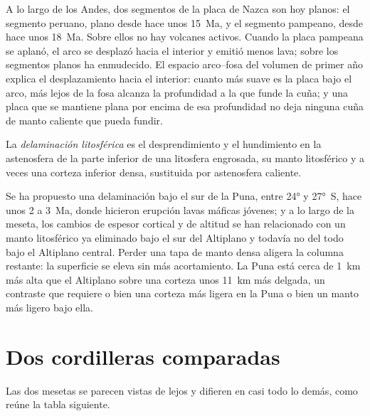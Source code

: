 A lo largo de los Andes, dos segmentos de la placa de Nazca son hoy planos: el segmento peruano, plano
desde hace unos \qty{15}{Ma}, y el segmento pampeano, desde hace unos \qty{18}{Ma}. Sobre ellos no
hay volcanes activos. Cuando la placa pampeana se aplanó, el arco se desplazó hacia el interior y emitió
menos lava; sobre los segmentos planos ha enmudecido. El espacio arco--fosa del volumen de primer año
explica el desplazamiento hacia el interior: cuanto más suave es la placa bajo el arco, más lejos de la fosa
alcanza la profundidad a la que funde la cuña; y una placa que se mantiene plana por encima de esa profundidad no deja
ninguna cuña de manto caliente que pueda fundir.

\begin{definition}\label{def:b2:himalaya-andes:delamination}
La \emph{delaminación litosférica} es el desprendimiento y el
hundimiento en la astenosfera de la parte inferior de una litosfera engrosada, su manto
litosférico y a veces una corteza inferior densa, sustituida por astenosfera caliente.
\end{definition}

Se ha propuesto una delaminación bajo el sur de la Puna, entre \ang{24} y \ang{27}~S,
hace unos 2 a \qty{3}{Ma}, donde hicieron erupción lavas máficas jóvenes; y a lo largo de la meseta, los cambios
de espesor cortical y de altitud se han relacionado con un manto litosférico ya eliminado
bajo el sur del Altiplano y todavía no del todo bajo el Altiplano central. Perder una
tapa de manto densa aligera la columna restante: la superficie se eleva sin más
acortamiento. La Puna está cerca de \qty{1}{km} más alta que el Altiplano sobre una corteza unos
\qty{11}{km} más delgada, un contraste que requiere o bien una corteza más ligera en la Puna o bien un manto más ligero
bajo ella.

\section{Dos cordilleras comparadas}\label{sec:b2:himalaya-andes:compared}

Las dos mesetas se parecen vistas de lejos y difieren en casi todo lo demás, como reúne la tabla
siguiente.

